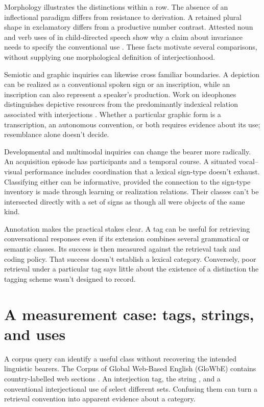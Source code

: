 \documentclass[12pt]{article}
\begin{document}
Morphology illustrates the distinctions within a row. The absence of an inflectional paradigm differs from resistance
to derivation. A retained plural shape in exclamatory 
differs from a productive number contrast. Attested noun and verb
uses of  in child-directed speech show why a claim
about invariance needs to specify the conventional use
\citep[36]{stange2016}. These facts motivate several comparisons,
without supplying one morphological definition of interjectionhood.

Semiotic and graphic inquiries can likewise cross familiar boundaries.
A depiction can be realized as a conventional spoken sign or an
inscription, while an inscription can also represent a speaker's
production. Work on ideophones distinguishes depictive resources
from the predominantly indexical relation associated with interjections
\citep{dingemanse2018,dingemanseakita2017}. Whether a particular graphic
form is a transcription, an autonomous convention, or both requires
evidence about its use; resemblance alone doesn't decide.

Developmental and multimodal inquiries can change the bearer more
radically. An acquisition episode has participants and a temporal
course. A situated vocal--visual performance includes coordination
that a lexical sign-type doesn't exhaust. Classifying either can
be informative, provided the connection to the sign-type inventory
is made through learning or realization relations. Their classes
can't be intersected directly with a set of signs as though all
were objects of the same kind.

Annotation makes the practical stakes clear. A tag can be useful
for retrieving conversational responses even if its extension combines
several grammatical or semantic classes. Its success is then measured
against the retrieval task and coding policy. That success doesn't
establish a lexical category. Conversely, poor retrieval under a
particular tag says little about the existence of a distinction
the tagging scheme wasn't designed to record.

\section{A measurement case: tags, strings, and uses}\label{sec:evidence}

A corpus query can identify a useful class without recovering the intended
linguistic bearers. The Corpus of Global Web-Based English (GloWbE)
contains country-labelled web sections \citep{daviesfuchs2015}.
An interjection tag, the string , and a conventional
interjectional use of  select different sets. Confusing them
can turn a retrieval convention into apparent evidence about a category.
\end{document}
